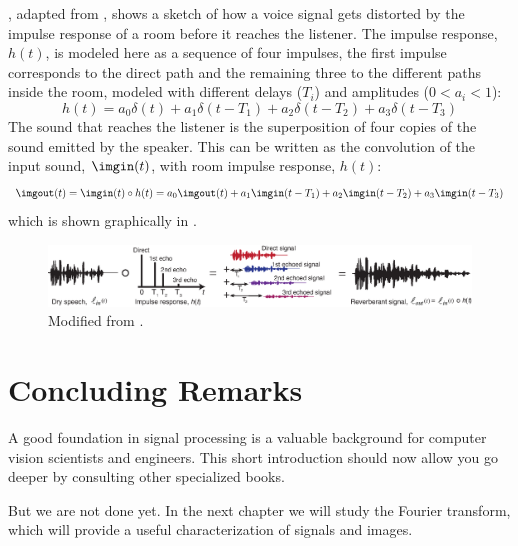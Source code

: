 \Fig{\ref{fig:impulse_response_room_b}}, adapted from \cite{TraerE7856}, shows a sketch of how a voice signal gets distorted by the impulse response of a room before it reaches the listener. The impulse response, $h (t)$, is modeled here as a sequence of four impulses, the first impulse corresponds to the direct path and the remaining three to the different paths inside the room, modeled with different delays ($T_i$) and amplitudes ($0 < a_i < 1$): 
\begin{equation}
h (t) = a_0 \delta (t)
+ a_1 \delta \left(t-T_1 \right) 
+ a_2 \delta \left( t-T_2 \right)
+ a_3 \delta \left( t-T_3 \right)
\end{equation}
The sound that reaches the listener is the superposition of four copies of the sound emitted by the speaker. This can be written as the convolution of the input sound, $\imgin (t)$, with room impulse response, $h (t)$:
\begin{equation}
\imgout (t) = \imgin (t) \circ h(t) = a_0 \imgout (t)
+ a_1 \imgin (t-T_1) 
+ a_2 \imgin (t-T_2)
+ a_3 \imgin (t-T_3)
\end{equation}
which is shown graphically in \fig{\ref{fig:impulse_response_room_b}}.
\begin{figure}
\centerline{
\includegraphics[width=1\linewidth]{figures/linear_image_filtering/impulse_response_room_b.eps}
} 
\caption{Modified from \cite{TraerE7856}.}
\label{fig:impulse_response_room_b}
\end{figure}

\section{Concluding Remarks}

A good foundation in signal processing is a valuable background for computer vision scientists and engineers. This short introduction should now allow you go deeper by consulting other specialized books. 

But we are not done yet. In the next chapter we will study the Fourier transform, which will provide a useful characterization of signals and images.  


